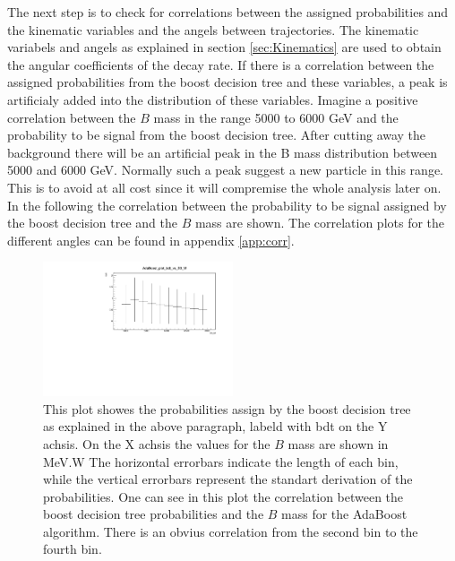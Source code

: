 \documentclass[english]{uzhpub}
\begin{document}
 The next step is to check for correlations between the assigned probabilities and the kinematic variables and the angels between trajectories. The kinematic variabels and angels as explained in section \ref{sec:Kinematics} are used to obtain the angular coefficients of the decay rate. If there is a correlation between the assigned probabilities from the boost decision tree and these variables, a peak is artificialy added into the distribution of these variables. Imagine a positive correlation between the $B$ mass in the range 5000 to 6000 GeV and the probability to be signal from the boost decision tree. After cutting away the background there will be an artificial peak in the B mass distribution between 5000 and 6000 GeV. Normally such a peak suggest a new particle in this range. This is to avoid at all cost since it will compremise the whole analysis later on. \\
In the following the correlation between the probability to be signal assigned by the boost decision tree and the $B$ mass are shown. The correlation plots for the different angles can be found in appendix \ref{app:corr}.



 \begin{figure}[H]
  \centering
  \includegraphics[width=0.5\textwidth]{plots/AdaBoost_plot_bdt_vs_B0_M}
  \caption{This plot showes the probabilities assign by the boost decision tree as explained in the above paragraph, labeld with bdt on the Y achsis. On the X achsis the values for the $B$ mass are shown in MeV.W The horizontal errorbars indicate the length of each bin, while the vertical errorbars represent the standart derivation of the probabilities. One can see in this plot the correlation between the boost decision tree probabilities and the $B$ mass for the AdaBoost algorithm. There is an obvius correlation from the second bin to the fourth bin.}
  \label{fig:AdaB0M}
 \end{figure}
\end{document}
